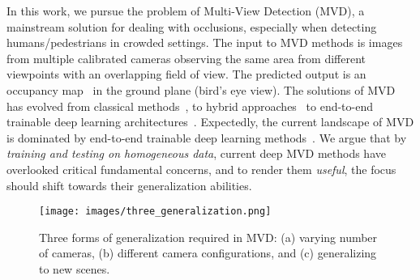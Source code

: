 \documentclass[letterpaper, 10 pt, conference]{ieeeconf}  \usepackage{times}
\begin{document}
In this work, we pursue the problem of Multi-View Detection (MVD), a mainstream solution for dealing with occlusions, especially when detecting humans/pedestrians in crowded settings. The input to MVD methods is images from multiple calibrated cameras observing the same area from different viewpoints with an overlapping field of view. The predicted output is an occupancy map~\cite{Fleuret2008MulticameraPT} in the ground plane (bird's eye view). The solutions of MVD has evolved from classical methods~\cite{Fleuret2008MulticameraPT,berclaz2011multiple,alahi2011sparsity}, to hybrid approaches~\cite{kong2020foveabox} to end-to-end trainable deep learning architectures~\cite{hou2020multiview}. Expectedly, the current landscape of MVD is dominated by end-to-end trainable deep learning methods~\cite{hou2020multiview,hou2021multiview,song2021stacked}. We argue that by \emph{training and testing on homogeneous data}, current deep MVD methods have overlooked critical fundamental concerns, and to render them \emph{useful}, the focus should shift towards their generalization abilities. 







\begin{figure}[t]
    \centering
    \texttt{[image: images/three\_generalization.png]}
    \caption{Three forms of generalization required in MVD: (a) varying number of cameras, (b) different camera configurations, and (c) generalizing to new scenes.}
    \label{fig:generalization}
\end{figure}
\end{document}
